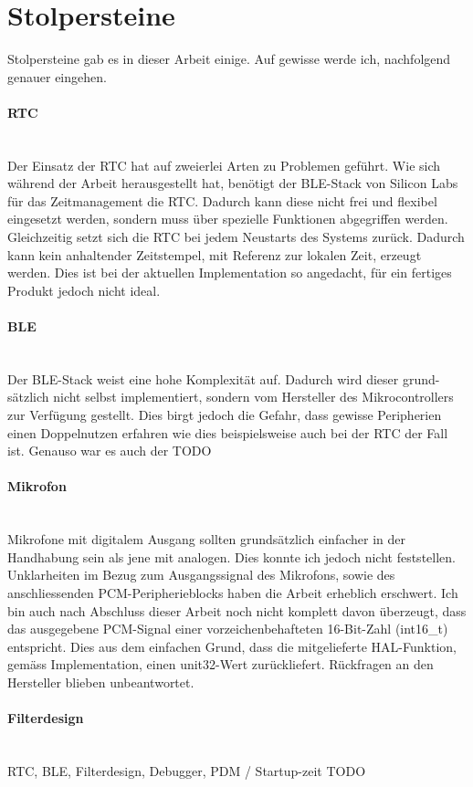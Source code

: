 \documentclass[12pt]{article}
\begin{document}
	\newpage
	\section{Stolpersteine}
	Stolpersteine gab es in dieser Arbeit einige. Auf gewisse werde ich, nachfolgend genauer eingehen.
	\paragraph{RTC}\mbox{}\\
	Der Einsatz der RTC hat auf zweierlei Arten zu Problemen geführt. Wie sich während der Arbeit herausgestellt hat, benötigt der BLE-Stack von Silicon Labs für das Zeitmanagement die RTC. Dadurch kann diese nicht frei und flexibel eingesetzt werden, sondern muss über spezielle Funktionen abgegriffen werden. Gleichzeitig setzt sich die RTC bei jedem Neustarts des Systems zurück. Dadurch kann kein anhaltender Zeitstempel, mit Referenz zur lokalen Zeit, erzeugt werden. Dies ist bei der aktuellen Implementation so angedacht, für ein fertiges Produkt jedoch nicht ideal.
	\paragraph{BLE}\mbox{}\\
	Der BLE-Stack weist eine hohe Komplexität auf. Dadurch wird dieser grund-sätzlich nicht selbst implementiert, sondern vom Hersteller des Mikrocontrollers zur Verfügung gestellt. Dies birgt jedoch die Gefahr, dass gewisse Peripherien einen Doppelnutzen erfahren wie dies beispielsweise auch bei der RTC der Fall ist. Genauso war es auch der \color{red}TODO\color{black}
	\paragraph{Mikrofon}\mbox{}\\
	Mikrofone mit digitalem Ausgang sollten grundsätzlich einfacher in der Handhabung sein als jene mit analogen. Dies konnte ich jedoch nicht feststellen. Unklarheiten im Bezug zum Ausgangssignal des Mikrofons, sowie des anschliessenden PCM-Peripherieblocks haben die Arbeit erheblich erschwert. Ich bin auch nach Abschluss dieser Arbeit noch nicht komplett davon überzeugt, dass das ausgegebene PCM-Signal einer vorzeichenbehafteten 16-Bit-Zahl (int16\_t) entspricht. Dies aus dem einfachen Grund, dass die mitgelieferte HAL-Funktion, gemäss Implementation, einen unit32-Wert zurückliefert. Rückfragen an den Hersteller blieben unbeantwortet.
	\paragraph{Filterdesign}\mbox{}\\
	RTC, BLE, Filterdesign, Debugger, PDM / Startup-zeit
	\color{red}TODO\color{black}
	
\end{document}

